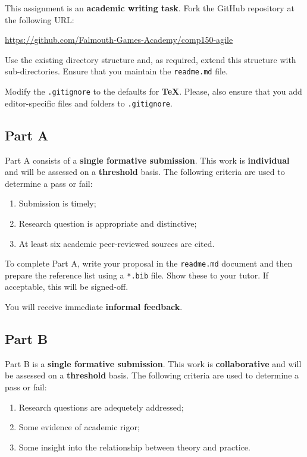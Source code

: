 \documentclass{../fal_assignment}
\begin{document}
This assignment is an \textbf{academic writing task}. Fork the GitHub repository at the following URL:

\indent \url{https://github.com/Falmouth-Games-Academy/comp150-agile}

Use the existing directory structure and, as required, extend this structure with sub-directories. Ensure that you maintain the \texttt{readme.md} file.

Modify the \texttt{.gitignore} to the defaults for \textbf{TeX}. Please, also ensure that you add editor-specific files and folders to \texttt{.gitignore}. 

\subsection*{Part A}

Part A consists of a \textbf{single formative submission}. This work is \textbf{individual} and will be assessed on a \textbf{threshold} basis. The following criteria are used to determine a pass or fail:

\begin{enumerate}[label=(\alph*)]
	\item Submission is timely;
	\item Research question is appropriate and distinctive;
	\item At least six academic peer-reviewed sources are cited.
\end{enumerate}

To complete Part A, write your proposal in the \texttt{readme.md} document and then prepare the reference list using a \texttt{*.bib} file.  Show these to your tutor.  If acceptable, this will be signed-off. 

You will receive immediate \textbf{informal feedback}.

\subsection*{Part B}

Part B is a \textbf{single formative submission}. This work is \textbf{collaborative} and will be assessed on a \textbf{threshold} basis. The following criteria are used to determine a pass or fail:

\begin{enumerate}[label=(\alph*)]
	\item Research questions are adequetely addressed;
	\item Some evidence of academic rigor;
	\item Some insight into the relationship between theory and practice.
\end{enumerate}
\end{document}
